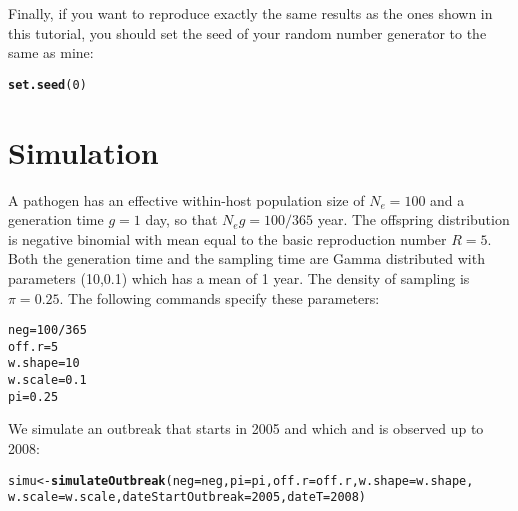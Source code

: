 \documentclass[a4paper]{article}\usepackage[]{graphicx}\usepackage[]{color}
\makeatletter
\newcommand{\hlnum}[1]{\textcolor[rgb]{0.686,0.059,0.569}{#1}}%
\newcommand{\hlopt}[1]{\textcolor[rgb]{0,0,0}{#1}}%
\newcommand{\hlstd}[1]{\textcolor[rgb]{0.345,0.345,0.345}{#1}}%
\newcommand{\hlkwb}[1]{\textcolor[rgb]{0.69,0.353,0.396}{#1}}%
\newcommand{\hlkwc}[1]{\textcolor[rgb]{0.333,0.667,0.333}{#1}}%
\newcommand{\hlkwd}[1]{\textcolor[rgb]{0.737,0.353,0.396}{\textbf{#1}}}%
\newenvironment{kframe}{%
 \def\at@end@of@kframe{}%
 \ifinner\ifhmode%
  \def\at@end@of@kframe{\end{minipage}}%
  \begin{minipage}{\columnwidth}%
 \fi\fi%
 \def\FrameCommand##1{\hskip\@totalleftmargin \hskip-\fboxsep
 \colorbox{shadecolor}{##1}\hskip-\fboxsep
     \hskip-\linewidth \hskip-\@totalleftmargin \hskip\columnwidth}%
 \MakeFramed {\advance\hsize-\width
   \@totalleftmargin\z@ \linewidth\hsize
   \@setminipage}}%
 {\par\unskip\endMakeFramed%
 \at@end@of@kframe}
\newenvironment{knitrout}{}{} %
\makeatother
\begin{document}
Finally, if you want to reproduce exactly the same results as the ones shown in this tutorial, you should set the seed of your random number generator to the same as mine:
\begin{knitrout}
\color{fgcolor}\begin{kframe}
\begin{alltt}
\hlkwd{set.seed}\hlstd{(}\hlnum{0}\hlstd{)}
\end{alltt}
\end{kframe}
\end{knitrout}

\section{Simulation}

A pathogen has an effective within-host population size of $N_e=100$ and a generation time $g=1$ day, so that $N_e g=100/365$ year. The offspring distribution is negative binomial with mean equal to the basic reproduction number $R=5$. Both the generation time and the sampling time are Gamma distributed with parameters (10,0.1) which has a mean of 1 year. The density of sampling is $\pi=0.25$. The following commands specify these parameters:
\begin{knitrout}
\color{fgcolor}\begin{kframe}
\begin{alltt}
\hlstd{neg}\hlkwb{=}\hlnum{100}\hlopt{/}\hlnum{365}
\hlstd{off.r}\hlkwb{=}\hlnum{5}
\hlstd{w.shape}\hlkwb{=}\hlnum{10}
\hlstd{w.scale}\hlkwb{=}\hlnum{0.1}
\hlstd{pi}\hlkwb{=}\hlnum{0.25}
\end{alltt}
\end{kframe}
\end{knitrout}

We simulate an outbreak that starts in 2005 and which and is observed up to 2008:

\begin{knitrout}
\color{fgcolor}\begin{kframe}
\begin{alltt}
\hlstd{simu} \hlkwb{<-} \hlkwd{simulateOutbreak}\hlstd{(}\hlkwc{neg}\hlstd{=neg,}\hlkwc{pi}\hlstd{=pi,}\hlkwc{off.r}\hlstd{=off.r,}\hlkwc{w.shape}\hlstd{=w.shape,}
                         \hlkwc{w.scale}\hlstd{=w.scale,}\hlkwc{dateStartOutbreak}\hlstd{=}\hlnum{2005}\hlstd{,}\hlkwc{dateT}\hlstd{=}\hlnum{2008}\hlstd{)}
\end{alltt}
\end{kframe}
\end{knitrout}
\end{document}
